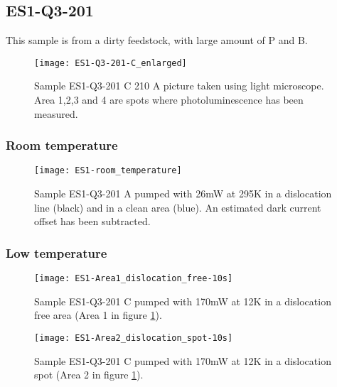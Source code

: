 \subsection{ES1-Q3-201}

This sample is from a dirty feedstock, with large amount of P and B.


\begin{figure}[H]
\centering
\texttt{[image: ES1-Q3-201-C\_enlarged]}
\caption[ES1-Q3-201 C from light microscope]{Sample ES1-Q3-201 C 210 A picture taken using light microscope. Area 1,2,3 and 4 are spots where photoluminescence has been measured.}
\label{fig:ES1-Q3-201-C_enlarged}%
\end{figure}

\subsubsection{Room temperature}

\begin{figure}[H]
\centering
\texttt{[image: ES1-room\_temperature]}
\caption[ES1-Q3-201 at room temperature]{Sample ES1-Q3-201 A pumped with 26mW at 295K in a dislocation line (black) and in a clean area (blue). An estimated dark current offset has been subtracted.}
\label{fig:ES1-room_temperature}%
\end{figure}


\subsubsection{Low temperature}

\begin{figure}[H]
\centering
\texttt{[image: ES1-Area1\_dislocation\_free-10s]}
\caption[ES1-Q3-201 at a dislocation free area]{Sample ES1-Q3-201 C pumped with 170mW at 12K in a dislocation free area (Area 1 in figure \ref{fig:ES1-Q3-201-C_enlarged}).}
\label{fig:ES1-Area1_dislocation_free-10s}%
\end{figure}

\begin{figure}[H]
\centering
\texttt{[image: ES1-Area2\_dislocation\_spot-10s]}
\caption[ES1-Q3-201 at a dislocation free area]{Sample ES1-Q3-201 C pumped with 170mW at 12K in a dislocation spot (Area 2 in figure \ref{fig:ES1-Q3-201-C_enlarged}).}
\label{fig:ES1-Area2_dislocation_spot-10s}%
\end{figure}


